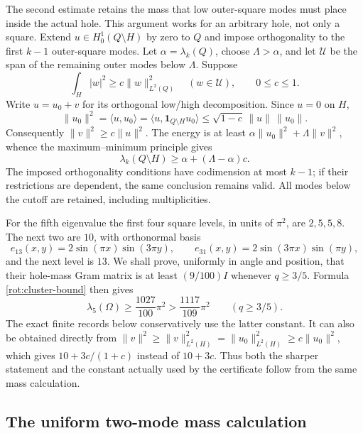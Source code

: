\documentclass[11pt,reqno]{amsart}
\numberwithin{equation}{section}
\begin{document}
The second estimate retains the mass that low outer-square modes must
place inside the actual hole. This argument works for an arbitrary
hole, not only a square. Extend $u\in H^1_0(Q\setminus H)$ by zero to
$Q$ and impose orthogonality to the first $k-1$ outer-square modes.
Let $\alpha=\lambda_k(Q)$, choose $\Lambda>\alpha$, and let $\mathcal U$
be the span of the remaining outer modes below $\Lambda$. Suppose
\begin{equation}\label{rot:mass-hypothesis}
 \int_H|w|^2\geq c\|w\|_{L^2(Q)}^2
       \quad(w\in\mathcal U),\qquad 0\leq c\leq1.
\end{equation}
Write $u=u_0+v$ for its orthogonal low/high decomposition. Since $u=0$
on $H$,
\[
 \|u_0\|^2=\langle u,u_0\rangle
     =\langle u,\mathbf1_{Q\setminus H}u_0\rangle
     \leq\sqrt{1-c}\,\|u\|\,\|u_0\|.
\]
Consequently $\|v\|^2\geq c\|u\|^2$. The energy is at least
$\alpha\|u_0\|^2+\Lambda\|v\|^2$, whence the maximum--minimum
principle gives
\begin{equation}\label{rot:cluster-bound}
 \lambda_k(Q\setminus H)\geq\alpha+(\Lambda-\alpha)c.
\end{equation}
The imposed orthogonality conditions have codimension at most $k-1$;
if their restrictions are dependent, the same conclusion remains valid.
All modes below the cutoff are retained, including multiplicities.

For the fifth eigenvalue the first four square levels, in units of
$\pi^2$, are $2,5,5,8$. The next two are $10$, with orthonormal basis
\[
 e_{13}(x,y)=2\sin(\pi x)\sin(3\pi y),\qquad
 e_{31}(x,y)=2\sin(3\pi x)\sin(\pi y),
\]
and the next level is $13$. We shall prove, uniformly in angle and
position, that their hole-mass Gram matrix is at least $(9/100)I$
whenever $q\geq3/5$. Formula \eqref{rot:cluster-bound} then gives
\begin{equation}\label{rot:fifth-bound}
 \lambda_5(\Omega)\geq\frac{1027}{100}\pi^2
       >\frac{1117}{109}\pi^2\qquad(q\geq3/5).
\end{equation}
The exact finite records below conservatively use the latter constant.
It can also be obtained directly from
$\|v\|^2\geq\|v\|_{L^2(H)}^2=\|u_0\|_{L^2(H)}^2
\geq c\|u_0\|^2$, which gives $10+3c/(1+c)$ instead of $10+3c$.
Thus both the sharper statement and the constant actually used by the
certificate follow from the same mass calculation.

\subsection{The uniform two-mode mass calculation}
\label{rot:gram-certificate}
\end{document}
